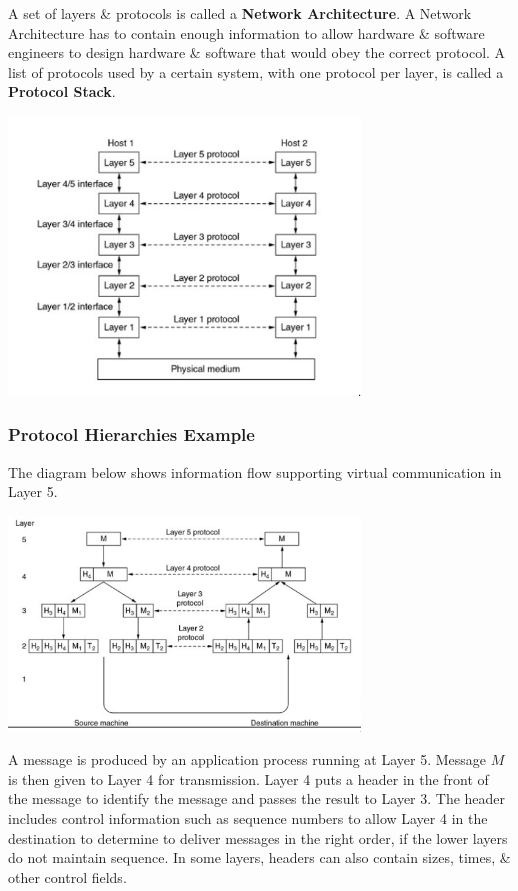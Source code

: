 \documentclass[11pt]{article}
\begin{document}
A set of layers \& protocols is called a \textbf{Network Architecture}. 
A Network Architecture has to contain enough information to allow hardware \& software engineers to design hardware \& software 
that would obey the correct protocol. 
A list of protocols used by a certain system, with one protocol per layer, is called a \textbf{Protocol Stack}. 

\begin{center}
    \includegraphics[width=0.7\textwidth]{protocolhierarchies.png}
\end{center}

\newpage
\subsubsection{Protocol Hierarchies Example}
The diagram below shows information flow supporting virtual communication in Layer 5. 

\begin{center}
    \includegraphics[width=0.7\textwidth]{protocol-hierarchies-example.png}
\end{center}

A message is produced by an application process running at Layer 5. 
Message $M$ is then given to Layer 4 for transmission. 
Layer 4 puts a header in the front of the message to identify the message and passes the result to Layer 3. 
The header includes control information such as sequence numbers to allow Layer 4 in the destination to determine to deliver 
messages in the right order, if the lower layers do not maintain sequence. 
In some layers, headers can also contain sizes, times, \& other control fields. 
\end{document}
